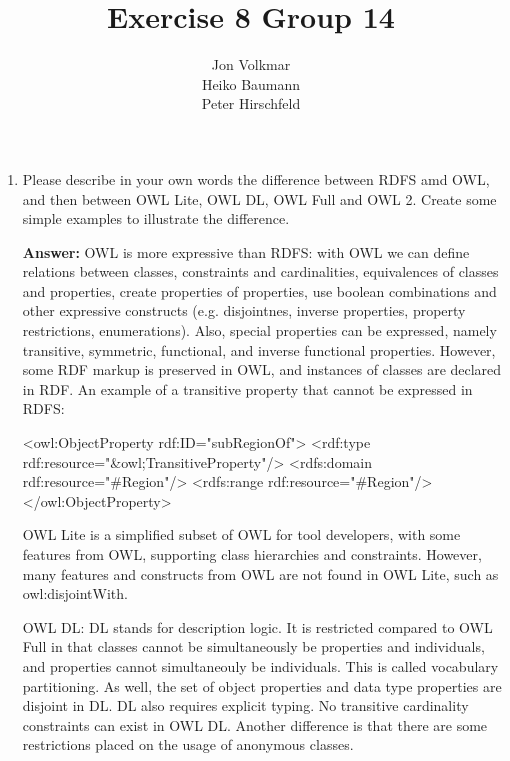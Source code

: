 \documentclass[10pt,a4paper]{article}
\title{\textbf{Exercise 8 Group 14}}
\author{Jon Volkmar\\
		Heiko Baumann\\
		Peter Hirschfeld}
\date{}
\begin{document}
\maketitle


\begin{enumerate}
\item Please describe in your own words the difference between RDFS amd OWL, and 
then between OWL Lite, OWL DL, OWL Full and OWL 2. Create some simple 
examples to illustrate the difference.

\textbf{Answer:}
OWL is more expressive than RDFS: with OWL we can define relations between classes, constraints and cardinalities, equivalences of classes and properties, create properties of properties, use boolean combinations and other expressive constructs (e.g. disjointnes, inverse properties, property restrictions, enumerations). Also, special properties can be expressed, namely transitive, symmetric, functional, and inverse functional properties. However, some RDF markup is preserved in OWL, and instances of classes are declared in RDF. An example of a transitive property that cannot be expressed in RDFS:

\begin{verbatimtab}
<owl:ObjectProperty rdf:ID="subRegionOf">
  <rdf:type rdf:resource="&owl;TransitiveProperty"/>
  <rdfs:domain rdf:resource="#Region"/>
  <rdfs:range  rdf:resource="#Region"/>
</owl:ObjectProperty>
\end{verbatimtab}

OWL Lite is a simplified subset of OWL for tool developers, with some features from OWL, supporting class hierarchies and constraints. However, many features and constructs from OWL are not found in OWL Lite, such as owl:disjointWith.

OWL DL: DL stands for description logic. It is restricted compared to OWL Full in that classes cannot be simultaneously be properties and individuals, and properties cannot simultaneouly be individuals. This is called vocabulary partitioning. As well, the set of object properties and data type properties are disjoint in DL. DL also requires explicit typing. No transitive cardinality constraints can exist in OWL DL. Another difference is that there are some restrictions placed on the usage of anonymous classes.


\end{enumerate}
\end{document}
